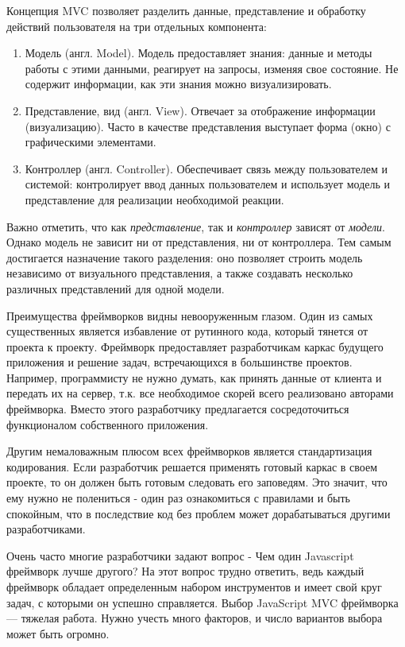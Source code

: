 Концепция MVC позволяет разделить данные, представление и обработку действий пользователя на три отдельных компонента:
\begin{enumerate}
\item Модель (англ. Model). Модель предоставляет знания: данные и методы работы с этими данными, реагирует на запросы, изменяя свое состояние. Не содержит информации, как эти знания можно визуализировать.
\item Представление, вид (англ. View). Отвечает за отображение информации (визуализацию). Часто в качестве представления выступает форма (окно) с графическими элементами.
\item Контроллер (англ. Controller). Обеспечивает связь между пользователем и системой: контролирует ввод данных пользователем и использует модель и представление для реализации необходимой реакции.
\end{enumerate}

Важно отметить, что как {\itshape представление}, так и {\itshape контроллер} зависят от {\itshape модели}. Однако модель не зависит ни от представления, ни от контроллера. Тем самым достигается назначение такого разделения: оно позволяет строить модель независимо от визуального представления, а также создавать несколько различных представлений для одной модели.


Преимущества фреймворков видны невооруженным глазом. Один из самых существенных является избавление от рутинного кода, который тянется от проекта к проекту. Фреймворк предоставляет разработчикам каркас будущего приложения и решение задач, встречающихся в большинстве проектов. Например, программисту не нужно думать, как принять данные от клиента и передать их на сервер, т.к. все необходимое скорей всего реализовано авторами фреймворка. Вместо этого разработчику предлагается сосредоточиться функционалом собственного приложения.

Другим немаловажным плюсом всех фреймворков является стандартизация кодирования. Если разработчик решается применять готовый каркас в своем проекте, то он должен быть готовым следовать его заповедям. Это значит, что ему нужно не полениться - один раз ознакомиться с правилами и быть спокойным, что в последствие код без проблем может дорабатываться другими разработчиками. 

Очень часто многие разработчики задают вопрос -  Чем один Javascript фреймворк лучше другого? На этот вопрос трудно ответить, ведь каждый фреймворк обладает определенным набором инструментов и имеет свой круг задач, с которыми он успешно справляется. Выбор JavaScript MVC фреймворка — тяжелая работа. Нужно учесть много факторов, и число вариантов выбора может быть огромно. 


